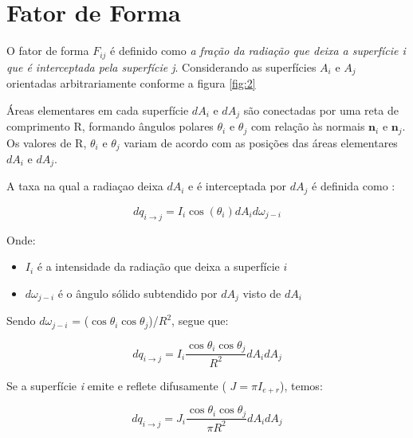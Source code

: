 \section{Fator de Forma}
O fator de forma $F_{ij}$ é definido como \textit{ a fração da radiação que deixa a superfície i que é interceptada pela superfície j}. Considerando as superfícies $A_{i}$ e $A_{j}$ orientadas arbitrariamente conforme a figura \ref{fig:2}



Áreas elementares em cada superfície $dA_{i}$ e $dA_{j}$ são conectadas por uma reta de comprimento R, formando ângulos polares $\theta _{i}$ e $\theta _{j}$ com relação às normais $\textbf{n}_{i}$ e $\textbf{n}_{j}$. Os valores de R, $\theta _{i}$ e $\theta _{j}$ variam de acordo com as posições das áreas elementares $dA_{i}$ e $dA_{j}$.

A taxa na qual a radiaçao deixa $dA_{i}$ e é interceptada por $dA_{j}$ é definida como :

\[dq_{i \rightarrow j} = I_{i}\cos(\theta _{i})dA_{i}d\omega _{j-i}\]

Onde:
\begin{itemize}
\item $I_{i}$ é a intensidade da radiação que deixa a superfície $i$
\item $d\omega _{j-i}$ é o ângulo sólido subtendido por $dA_{j}$ visto de $dA_{i}$
\end{itemize}

Sendo $d\omega _{j-i}$ = ($\cos\theta_{i}\cos\theta_{j}$)/$R^{2}$, segue que:

\[dq_{i \rightarrow j} = I_{i}\frac{\cos\theta_{i}\cos\theta_{j}}{R^{2}}dA_{i}dA_{j} \]

Se a superfície \textit{i} emite e reflete difusamente ( $J = \pi I_{e+r}$), temos:

\[
	dq_{i \rightarrow j} = J_{i}\frac{\cos\theta_{i}\cos\theta_{j}}{\pi R^{2}}dA_{i}dA_{j} 
\]

